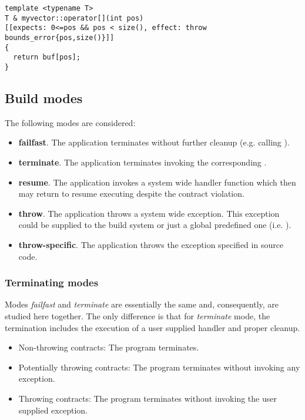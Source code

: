 \begin{lstlisting}
template <typename T>
T & myvector::operator[](int pos) 
[[expects: 0<=pos && pos < size(), effect: throw bounds_error{pos,size()}]]
{
  return buf[pos];
}
\end{lstlisting}

\subsection {Build modes}

The following modes are considered:

\begin{itemize}
  \item \textbf{failfast}. The application terminates without further cleanup
(e.g. calling ).
  \item \textbf{terminate}. The application terminates invoking the
corresponding .
  \item \textbf{resume}. The application invokes a system wide handler function
which then may return to resume executing despite the contract violation.
  \item \textbf{throw}. The application throws a system wide exception. This
exception could be supplied to the build system or just a global predefined one
(i.e. ).
  \item \textbf{throw-specific}. The application throws the exception specified
in source code.
\end{itemize}

\subsubsection{Terminating modes}

Modes \emph{failfast} and \emph{terminate} are essentially the same and,
consequently, are studied here together. The only difference is that for
\emph{terminate} mode, the termination includes the execution of a user supplied
handler and proper cleanup.

\begin{itemize}
  \item Non-throwing contracts: The program terminates.
  \item Potentially throwing contracts: The program terminates without invoking
any exception.
  \item Throwing contracts: The program terminates without invoking the user
supplied exception.
\end{itemize}

